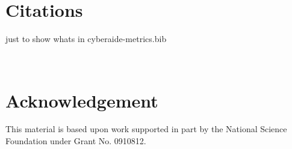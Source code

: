 \documentclass{sig-alternate}
\begin{document}
\section{Citations}

just to show whats in cyberaide-metrics.bib

 

 
  
\section*{Acknowledgement} 
 
This material is based upon work supported in part by the National Science Foundation under Grant No. 0910812.
 
 
 
% 


 
\end{document}

